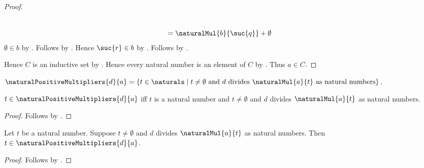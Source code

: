 \begin{proof}
\begin{subproof}
\begin{byCase}
\begin{align*}
                        \\
                        &= \naturalMul{b}{\suc{q}}+\emptyset
                \end{align*}
                $\emptyset\in b$
                    by .
                Follows by .
                Hence $\suc{r}\in b$
                    by .
                Follows by .
        \end{byCase}
    \end{subproof}
    Hence $C$ is an inductive set by .
    Hence every natural number is an element of $C$
        by .
    Thus $a\in C$.
\end{proof}

\begin{definition}\label{positive_multiplier_set}
    $\naturalPositiveMultipliers{d}{a}=
        \{t\in\naturals\mid
            \text{$t\neq\emptyset$ and
                $d$ divides $\naturalMul{a}{t}$ as natural numbers}\}$.
\end{definition}

\begin{proposition}\label{positive_multiplier_iff}
    $t\in\naturalPositiveMultipliers{d}{a}$ iff
        $t$ is a natural number and $t\neq\emptyset$ and
        $d$ divides $\naturalMul{a}{t}$ as natural numbers.
\end{proposition}
\begin{proof}
    Follows by .
\end{proof}

\begin{proposition}\label{positive_multiplier_intro}
    Let $t$ be a natural number.
    Suppose $t\neq\emptyset$ and
        $d$ divides $\naturalMul{a}{t}$ as natural numbers.
    Then $t\in\naturalPositiveMultipliers{d}{a}$.
\end{proposition}
\begin{proof}
    Follows by .
\end{proof}

